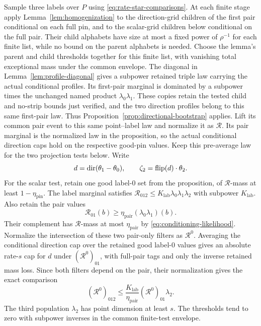 Sample three labels over $P$ using \eqref{eq:rate-star-comparisons}.
At each finite stage apply Lemma~\ref{lem:homogenization} to the
direction-grid children of the first pair conditional on each full pin,
and to the scalar-grid children below conditional on the full pair.
Their child alphabets have size at most a fixed power of $\rho^{-1}$
for each finite list, while no bound on the parent alphabets is needed.
Choose the lemma's parent and child thresholds
together for this finite list, with vanishing total exceptional mass
under the common envelope.  The diagonal in
Lemma~\ref{lem:profile-diagonal} gives a subpower retained triple law
carrying the actual conditional profiles.
Its first-pair marginal is dominated by a subpower times the unchanged
named product $\lambda_0\lambda_1$.  These copies retain the tested
child and no-strip bounds just verified, and the two direction profiles
belong to this same first-pair law.  Thus
Proposition~\ref{prop:directional-bootstrap} applies.  Lift its common
pair event to this same point--label law and normalize it as
$\mathcal R$.  Its pair marginal is the normalized law in the
proposition, so the actual conditional direction caps hold on the
respective good-pin values.  Keep this pre-average law for the two
projection tests below.  Write
\[
 d=\operatorname{dir}(\theta_1-\theta_0),\qquad
 \zeta_2=\operatorname{flip}(d)\cdot\theta_2.
\]
For the scalar test, retain one good label-$0$ set from the proposition,
of $\mathcal R$-mass at least $1-\eta_{\mathrm{pin}}$.
The label marginal satisfies
$\mathcal R_{012}\le K_{\mathrm{lab}}\lambda_0\lambda_1\lambda_2$
with subpower $K_{\mathrm{lab}}$.  Also retain the pair values
\[
 \mathcal R_{01}(b)\ge
       \eta_{\mathrm{pair}}(\lambda_0\lambda_1)(b).
\]
Their complement has $\mathcal R$-mass at most
$\eta_{\mathrm{pair}}$ by \eqref{eq:conditioning-likelihood}.
Normalize the intersection of these two pair-only filters as
$\mathcal R^0$.  Averaging the conditional direction cap over the
retained good label-$0$ values gives an absolute rate-$s$ cap for
$d$ under $(\mathcal R^0)_{01}$, with full-pair tags and only the
inverse retained mass loss.  Since both filters depend on the pair,
their normalization gives the exact comparison
\[
 (\mathcal R^0)_{012}
 \le\frac{K_{\mathrm{lab}}}{\eta_{\mathrm{pair}}}
       (\mathcal R^0)_{01}\lambda_2.
\]
The third population $\lambda_2$ has point dimension at least $s$.
The thresholds tend to zero with subpower inverses in the common
finite-test envelope.

